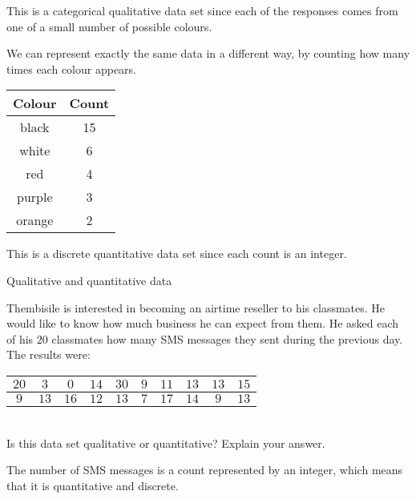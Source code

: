   This is a categorical qualitative data set since each of the
  responses comes from one of a small number of possible colours.

  We can represent exactly the same data in a different way, by
  counting how many times each colour appears.

  \begin{center}
    \begin{tabular}{|c|c|}\hline
      
      \textbf{Colour} & \textbf{Count} \\ \hline

      black & 15 \\
      white & 6 \\
      red & 4 \\
      purple & 3 \\
      orange & 2\\
    \hline
    \end{tabular}
  \end{center}

  This is a discrete quantitative data set since each count is an
  integer.


\begin{wex}{Qualitative and quantitative data}{
    Thembisile is interested in becoming an airtime reseller to his
    classmates. He would like to know how much business he can expect
    from them. He asked each of his $20$ classmates how many SMS
    messages they sent during the previous day. The results were:
\\

    \begin{center}
      \begin{tabular}{|c|c|c|c|c|c|c|c|c|c|}\hline
        $20$ & $ 3$ & $ 0$ & $14$ & $30$ & $9$ & $11$ & $13$ & $13$ & $15$ \\ \hline
         $9$ & $13$ & $16$ & $12$ & $13$ & $7$ & $17$ & $14$ & $ 9$ & $13$ \\ \hline
        
      \end{tabular}
    \end{center}
\vspace{8pt}\\

    Is this data set qualitative or quantitative? Explain your answer.
}{
  The number of SMS messages is a count represented by an integer, which means that it is
  quantitative and discrete.

}
\end{wex}

